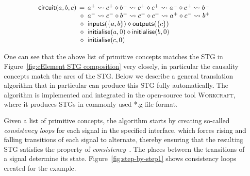 \documentclass[british, journal]{IEEEtran}
\newcommand{\noun}[1]{\textsc{#1}}
\begin{document}
\vspace{-3mm}
\[
\begin{array}{lcl}
\hspace{-2mm}\mathsf{circuit}(a,b,c)&\hspace{-2mm}=&\hspace{-2mm}a^{+}\rightsquigarrow c^{+} \diamond b^{+}\rightsquigarrow c^{+} \diamond c^{+}\rightsquigarrow a^{-} \diamond c^{+}
\rightsquigarrow b^{-}\\
~&\hspace{-2mm}\diamond&\hspace{-2mm}a^{-}\rightsquigarrow c^{-} \diamond b^{-}\rightsquigarrow c^{-} \diamond c^{-}\rightsquigarrow a^{+} \diamond c^{-}\rightsquigarrow b^{+}\\
~&\hspace{-2mm}\diamond&\hspace{-2mm}\mathsf{inputs}(\{a,b\})\diamond\mathsf{outputs}(\{c\})\\
~&\hspace{-2mm}\diamond&\hspace{-2mm}\mathsf{initialise}(a,0) \diamond \mathsf{initialise}(b,0)\\
~&\hspace{-2mm}\diamond&\hspace{-2mm}\mathsf{initialise}(c,0)
\end{array}
\]

\noindent One can see that the above list of primitive concepts matches
the STG in Figure~\ref{fig:cElement STG composition} very closely, in particular
the causality concepts match the arcs of the STG. Below we describe a general
translation algorithm that in particular can produce this STG fully automatically.
The algorithm is implemented and integrated in the open-source tool \noun{Workcraft},
where it produces STGs in commonly used \textsf{*.g} file format.

Given a list of primitive concepts, the algorithm starts by creating so-called
\emph{consistency loops} for each signal in the specified interface, which forces rising
and falling transitions of each signal to alternate, thereby ensuring that the resulting
STG satisfies the property of \emph{consistency}~\cite{Cortadella}.
The places between the transitions of a signal determine its state.
Figure~\ref{fig:step-by-step1} shows consistency loops created for the example.
\end{document}
